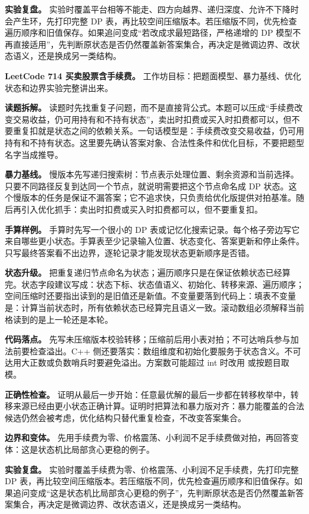 \textbf{实验复盘。} 实验时覆盖平台相等不能走、四方向越界、递归深度、允许不下降时会产生环，先打印完整 DP 表，再比较空间压缩版本。若压缩版不同，优先检查遍历顺序和旧值保存。如果追问变成“若改成求最短路径，严格递增的 DP 模型不再直接适用”，先判断原状态是否仍然覆盖新答案集合，再决定是微调边界、改状态语义，还是换成另一类结构。

\noindent\textbf{LeetCode 714 买卖股票含手续费。} 工作坊目标：把题面模型、暴力基线、优化状态和边界实验完整讲出来。

\textbf{读题拆解。} 读题时先找重复子问题，而不是直接背公式。本题可以压成“手续费改变交易收益，仍可用持有和不持有状态”，卖出时扣费或买入时扣费都可以，但不要重复扣就是状态之间的依赖关系。一句话模型是：手续费改变交易收益，仍可用持有和不持有状态。这里要先确认答案对象、合法性条件和优化目标，不要把题型名字当成推导。

\textbf{暴力基线。} 慢版本先写递归搜索树：节点表示处理位置、剩余资源和当前选择。只要不同路径反复到达同一个节点，就说明需要把这个节点命名成 DP 状态。这个慢版本的任务是保证不漏答案；它不追求快，只负责给优化版提供对拍基准。随后再引入优化抓手：卖出时扣费或买入时扣费都可以，但不要重复扣。

\textbf{手算样例。} 手算时先写一个很小的 DP 表或记忆化搜索记录。每个格子旁边写它来自哪些更小状态。手算表至少记录输入位置、状态变化、答案更新和停止条件。只写最终答案看不出边界，逐轮记录才能发现状态更新顺序是否错。

\textbf{状态升级。} 把重复递归节点命名为状态；遍历顺序只是在保证依赖状态已经算完。状态字段建议写成：状态下标、状态值语义、初始化、转移来源、遍历顺序；空间压缩时还要指出读到的是旧值还是新值。不变量要落到代码上：填表不变量是：计算当前状态时，所有依赖状态已经算完且语义一致。滚动数组必须解释当前格读到的是上一轮还是本轮。

\textbf{代码落点。} 先写未压缩版本校验转移；压缩前后用小表对拍；不可达哨兵参与加法前要检查溢出。C++ 侧还要落实：数组维度和初始化要服务于状态含义。不可达用大正数或负数哨兵时要避免溢出。方案数可能超过 int 时改用  或按题目取模。

\textbf{正确性检查。} 证明从最后一步开始：任意最优解的最后一步都在转移枚举中，转移来源已经由更小状态正确计算。证明时把算法和暴力版对齐：暴力能覆盖的合法候选仍然会被考虑，优化结构只替代重复检查，不改变答案集合。

\textbf{边界和变体。} 先用手续费为零、价格震荡、小利润不足手续费做对拍，再回答变体：这是状态机比局部贪心更稳的例子。

\textbf{实验复盘。} 实验时覆盖手续费为零、价格震荡、小利润不足手续费，先打印完整 DP 表，再比较空间压缩版本。若压缩版不同，优先检查遍历顺序和旧值保存。如果追问变成“这是状态机比局部贪心更稳的例子”，先判断原状态是否仍然覆盖新答案集合，再决定是微调边界、改状态语义，还是换成另一类结构。

